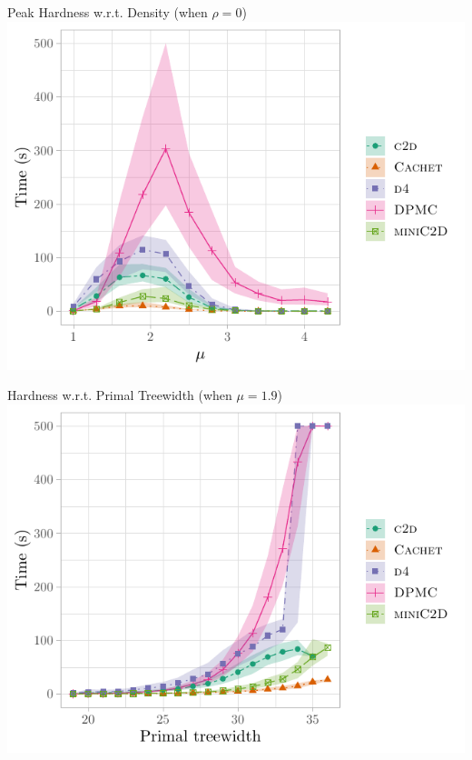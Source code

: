 \documentclass{beamer}
\begin{document}
\begin{frame}{Peak Hardness w.r.t. Density (when $\rho = 0$)}
  \centering
  \includegraphics{treewidth.pdf}
\end{frame}

\begin{frame}{Hardness w.r.t. Primal Treewidth (when $\mu = 1.9$)}
  \centering
  \includegraphics{treewidth2.pdf}
\end{frame}
\end{document}
